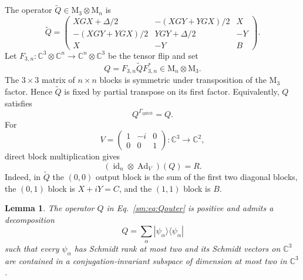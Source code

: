 \documentclass[aps,prl,reprint,superscriptaddress,nofootinbib]{revtex4-2}
\newcommand{\M}{\mathrm{M}}
\newcommand{\C}{\mathbb C}
\newcommand{\id}{\operatorname{id}}
\newcommand{\Ad}{\operatorname{Ad}}
\newtheorem{lemma}[theorem]{Lemma}
\begin{document}
The operator \(\widetilde Q\in\M_3\otimes\M_n\) is
\begin{equation}
 \widetilde Q=\begin{pmatrix}
 XGX+\Delta/2&-(XGY+YGX)/2&X\\
 -(XGY+YGX)/2&YGY+\Delta/2&-Y\\
 X&-Y&B
 \end{pmatrix}.
\label{sm:eq:Q}
\end{equation}
Let \(F_{3,n}:\C^3\otimes\C^n\to\C^n\otimes\C^3\) be the tensor flip and
set
\begin{equation}
 Q=F_{3,n}\widetilde QF_{3,n}^*\in\M_n\otimes\M_3.
\label{sm:eq:Qouter}
\end{equation}
The \(3\times3\) matrix of \(n\times n\) blocks is symmetric under
transposition of the \(\M_3\) factor.  Hence \(\widetilde Q\) is fixed by
partial transpose on its first factor.  Equivalently, \(Q\) satisfies
\begin{equation}
 Q^{\Gamma_{\mathrm{qutrit}}}=Q.
\label{sm:eq:Qptfixed}
\end{equation}
For
\begin{equation}
 V=\begin{pmatrix}1&-i&0\\0&0&1\end{pmatrix}:\C^3\to\C^2,
\label{sm:eq:V}
\end{equation}
direct block multiplication gives
\begin{equation}
 (\id_n\otimes\Ad_V)(Q)=R.
\label{sm:eq:recovery}
\end{equation}
Indeed, in \(\widetilde Q\) the \((0,0)\) output block is the
sum of the first two diagonal blocks, the \((0,1)\) block is \(X+iY=C\), and the
\((1,1)\) block is \(B\).

\begin{lemma}
\label{sm:thm:auxiliaryQ}
The operator \(Q\) in Eq.~\eqref{sm:eq:Qouter} is positive and admits a
decomposition
\begin{equation}
 Q=\sum_\alpha|\psi_\alpha\rangle\langle\psi_\alpha|
\label{sm:eq:puredecomp}
\end{equation}
such that every \(\psi_\alpha\) has Schmidt rank at most two and its
Schmidt vectors on $\C^3$ are contained in a conjugation-invariant subspace of
dimension at most two in \(\C^3\).
\end{lemma}
\end{document}
